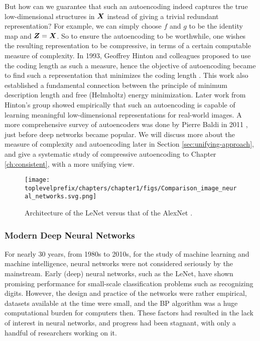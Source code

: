 \documentclass[\toplevelprefix/book-main.tex]{subfiles}
\begin{document}
But how can we guarantee that such an autoencoding indeed captures the true low-dimensional structures in $\bm{X}$ instead of giving a trivial redundant representation? For example, we can simply choose $f$ and $g$ to be the identity map and $\bm{Z} = \bm{X}$. So to ensure the autoencoding to be worthwhile, one wishes the resulting representation to be compressive, in terms of a certain computable measure of complexity. In 1993, Geoffrey Hinton and colleagues proposed to use the coding length as such a measure, hence the objective of autoencoding became to find such a representation that minimizes the coding length \cite{Hinton-1993}. This work also established a fundamental connection between the principle of minimum description length \cite{Rissanen-1978} and free (Helmholtz) energy minimization. Later work \cite{Hinton504} from Hinton's group showed empirically that such an autoencoding is capable of learning meaningful low-dimensional representations for real-world images. A more comprehensive survey of autoencoders was done by Pierre Baldi in 2011 \cite{Baldi2011}, just before deep networks became popular. We will discuss more about the measure of complexity and autoencoding later in Section \ref{sec:unifying-approach}, and give a systematic study of compressive autoencoding to Chapter \ref{ch:consistent}, with a more unifying view.


\begin{figure}
    \centering
    \texttt{[image: \\toplevelprefix/chapters/chapter1/figs/Comparison\_image\_neural\_networks.svg.png]}
    \caption{Architecture of the LeNet \cite{LeCun-1989} versus that of the AlexNet \cite{krizhevsky2012imagenet}.}
    \label{fig:LeNet-AlexNet}
\end{figure}


\subsubsection{Modern Deep Neural Networks}
For nearly 30 years, from 1980s to 2010s, for the study of machine learning and machine intelligence, neural networks were not considered seriously by the mainstream. Early (deep) neural networks, such as the LeNet, have shown promising performance for small-scale classification problems such as recognizing digits. However, the design and practice of the networks were rather empirical, datasets available at the time were small, and the BP algorithm was a huge computational burden for computers then. These factors had resulted in the lack of interest in neural networks, and progress had been stagnant, with only a handful of researchers working on it. 
\end{document}
